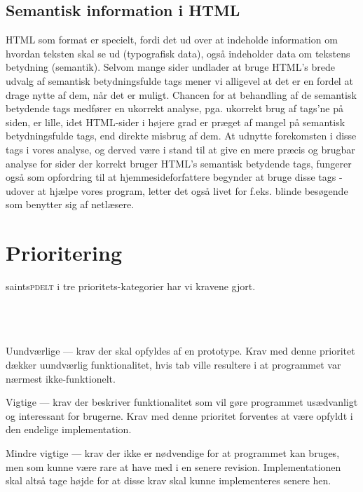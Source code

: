 \documentclass[a4paper,oneside,article, titlepage]{article}
\begin{document}
\subsection{Semantisk information i HTML}
HTML som format er specielt, fordi det ud over at indeholde
information om hvordan teksten skal se ud (typografisk data), også
indeholder data om tekstens betydning (semantik). Selvom mange sider
undlader at bruge HTML's brede udvalg af semantisk betydningsfulde
tags mener vi alligevel at det er en fordel at drage nytte af dem, når
det er muligt. Chancen for at behandling af de semantisk betydende
tags medfører en ukorrekt analyse, pga. ukorrekt brug af tags'ne på
siden, er lille, idet HTML-sider i højere grad er præget af mangel på
semantisk betydningsfulde tags, end direkte misbrug af dem. At udnytte
forekomsten i disse tags i vores analyse, og derved være i stand til
at give en mere præcis og brugbar analyse for sider der korrekt bruger
HTML's semantisk betydende tags, fungerer også som opfordring til at
hjemmesideforfattere begynder at bruge disse tags - udover at hjælpe
vores program, letter det også livet for f.eks. blinde besøgende som
benytter sig af netlæsere.

\section{Prioritering}
\lettrine[lines=5,findent=0.5em,loversize=0.07,nindent=0em,image=true]%
{saints}{pdelt} i tre prioritets-kategorier har vi kravene gjort.
\\\\\\\\
\begin{description}
\item Uundværlige --- krav der skal opfyldes af en
  prototype. Krav med denne prioritet dækker uundværlig
  funktionalitet, hvis tab ville resultere i at programmet var nærmest
  ikke-funktionelt.
\item Vigtige --- krav der beskriver funktionalitet som vil
  gøre programmet usædvanligt og interessant for brugerne. Krav med
  denne prioritet forventes at være opfyldt i den endelige
  implementation.
\item Mindre vigtige --- krav der ikke er nødvendige for at
  programmet kan bruges, men som kunne være rare at have med i en
  senere revision. Implementationen skal altså tage højde for at disse
  krav skal kunne implementeres senere hen.
\end{description}
\end{document}
